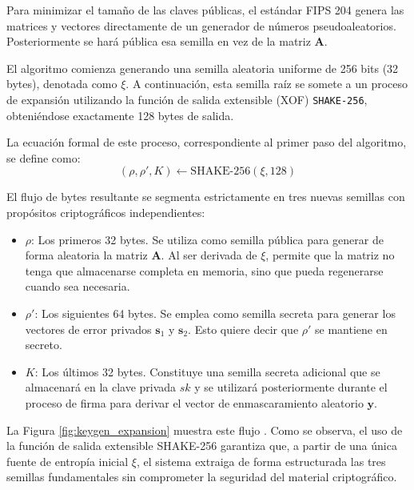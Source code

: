 \documentclass[11pt, a4paper]{report}
\theoremstyle{definition}
\begin{document}
Para minimizar el tamaño de las claves públicas, el estándar FIPS 204 genera las matrices y vectores directamente de un generador de números pseudoaleatorios. Posteriormente se hará pública esa semilla en vez de la matriz $\mathbf{A}$.

El algoritmo comienza generando una semilla aleatoria uniforme de 256 bits (32 bytes), denotada como $\xi$. A continuación, esta semilla raíz se somete a un proceso de expansión utilizando la función de salida extensible (XOF) \texttt{SHAKE-256}, obteniéndose exactamente 128 bytes de salida.

La ecuación formal de este proceso, correspondiente al primer paso del algoritmo, se define como:
\begin{equation}
    (\rho, \rho', K) \leftarrow \text{SHAKE-256}(\xi, 128)
\end{equation}

El flujo de bytes resultante se segmenta estrictamente en tres nuevas semillas con propósitos criptográficos independientes:
\begin{itemize}
    \item $\rho$: Los primeros 32 bytes. Se utiliza como semilla pública para generar de forma aleatoria la matriz $\mathbf{A}$. Al ser derivada de $\xi$, permite que la matriz no tenga que almacenarse completa en memoria, sino que pueda regenerarse cuando sea necesaria.
    \item $\rho'$: Los siguientes 64 bytes. Se emplea como semilla secreta para generar los vectores de error privados $\mathbf{s}_1$ y $\mathbf{s}_2$. Esto quiere decir que $\rho'$ se mantiene en secreto.
    \item $K$: Los últimos 32 bytes. Constituye una semilla secreta adicional que se almacenará en la clave privada $sk$ y se utilizará posteriormente durante el proceso de firma para derivar el vector de enmascaramiento aleatorio $\mathbf{y}$.

\end{itemize}
La Figura \ref{fig:keygen_expansion} muestra este flujo . Como se observa, el uso de la función de salida extensible SHAKE-256 garantiza que, a partir de una única fuente de entropía inicial $\xi$, el sistema extraiga de forma estructurada las tres semillas fundamentales sin comprometer la seguridad del material criptográfico.
\end{document}
